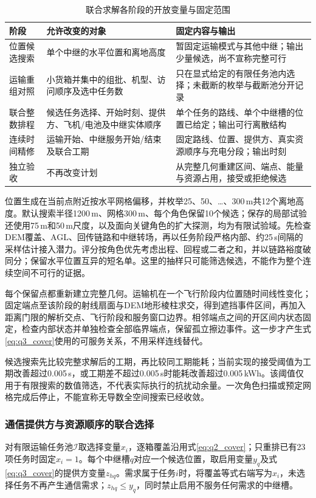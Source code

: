 \documentclass[withoutpreface,colorprint]{format}
\numberwithin{equation}{section}
\numberwithin{figure}{section}
\numberwithin{table}{section}
\begin{document}
\begin{table}[htbp]\centering\small
\caption{联合求解各阶段的开放变量与固定范围}\label{tab:q3_decision_scope}
\begin{tabularx}{\linewidth}{p{2.4cm}XX}\toprule
阶段 & 允许改变的对象 & 固定内容与输出\\\midrule
位置候选搜索 & 单个中继的水平位置和离地高度 & 暂固定运输模式与其他中继；输出少量候选，尚不宣称完整可行\\
运输重组对照 & 小货箱并集中的组批、机型、访问顺序及选中任务数 & 只在显式给定的有限任务池内选择；未截断的枚举与截断池分开记录\\
联合整数排程 & 候选任务选择、开始时刻、提供方、飞机/电池及中继实体顺序 & 单个任务的路线、单个中继槽的位置已给定；输出可行离散结构\\
连续时间精修 & 运输开始、中继服务开始/结束及联合工期 & 固定路线、位置、提供方、真实资源顺序与充电分段；输出时刻\\
独立验收 & 不再改变计划 & 从完整几何重建区间、端点、能量与资源占用，接受或拒绝候选\\\bottomrule
\end{tabularx}
\end{table}

位置生成在当前点附近按水平网格偏移，并枚举25、50、\ldots、300\,m共12个离地高度。默认搜索半径1200\,m、网格300\,m、每个角色保留10个候选；保存的局部试验还使用75\,m和50\,m尺度，以及面向关键角色的扩大探测，均为有限试验域。先检查DEM覆盖、AGL、回传链路和中继转场，再以任务阶段严格内部、约25\,s间隔的采样估计接入潜力。评分按角色优先考虑出程、回程或二者之和，并以链路裕度破同分；保留水平位置互异的短名单。这里的抽样只可能筛选候选，不能作为整个连续空间不可行的证据。

每个保留点都重新建立完整几何。运输机在一个飞行阶段内位置随时间线性变化；固定端点至该阶段的射线扇面与DEM地形棱柱求交，得到遮挡事件区间，再加入距离门限的解析交点、飞行阶段和服务窗口边界。相邻端点之间的开区间内状态固定，检查内部状态并单独检查全部临界端点，保留孤立擦边事件。这一步才产生式\eqref{eq:q3_cover}使用的可服务关系，不用采样连线替代。

候选搜索先比较完整求解后的工期，再比较同工期能耗；当前实现的接受阈值为工期改善超过0.005\,s，或工期差不超过0.005\,s时能耗改善超过0.005\,kWh。该阈值仅用于有限搜索的数值筛选，不代表实际执行的抗扰动余量。一次角色扫描或预定网格完成后停止，不能宣称无导数全空间搜索已经收敛。

\subsubsection{通信提供方与资源顺序的联合选择}
对有限运输任务池$\mathcal I$取选择变量$x_i$，逐箱覆盖沿用式\eqref{eq:q2_cover}；只重排已有23项任务时固定$x_i=1$。每个中继槽$q$对应一个候选位置，取启用变量$y_q$及式\eqref{eq:q3_cover}的提供方变量$z_{hq}$。需求属于任务$i$时，将覆盖等式右端写为$x_i$，未选择任务不再产生通信需求；$z_{hq}\le y_q$，同时禁止启用不服务任何需求的中继槽。
\end{document}
